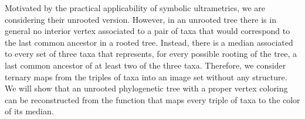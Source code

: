 \documentclass{article}
\newcommand{\TODO}[1]{\begingroup\color{red}#1\endgroup}
\begin{document}

Motivated by the practical applicability of symbolic ultrametrics, we are 
considering their unrooted version. However, in an unrooted tree there is in 
general no interior vertex associated to a pair of taxa that would correspond 
to 
the last common ancestor in a rooted tree. Instead, there is a median 
associated 
to every set of three taxa that represents, for every possible rooting of the tree, 
a last common ancestor of at least two of the three taxa. 
Therefore, we consider ternary maps from the triples of taxa into an image set 
without any structure. We will show that an unrooted phylogenetic tree with a 
proper vertex coloring can be reconstructed from the function that maps every 
triple of taxa to the color of its median. 

% 
% 
% 
% 
% 
% 
% 

%
%
\end{document}
